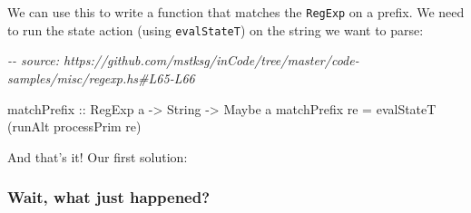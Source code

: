 \documentclass[]{article}
\newenvironment{Shaded}{}{}
\newcommand{\CommentTok}[1]{\textcolor[rgb]{0.38,0.63,0.69}{\textit{#1}}}
\newcommand{\DataTypeTok}[1]{\textcolor[rgb]{0.56,0.13,0.00}{#1}}
\newcommand{\DecValTok}[1]{\textcolor[rgb]{0.25,0.63,0.44}{#1}}
\newcommand{\FunctionTok}[1]{\textcolor[rgb]{0.02,0.16,0.49}{#1}}
\newcommand{\NormalTok}[1]{#1}
\newcommand{\OperatorTok}[1]{\textcolor[rgb]{0.40,0.40,0.40}{#1}}
\newcommand{\OtherTok}[1]{\textcolor[rgb]{0.00,0.44,0.13}{#1}}
\newcommand{\StringTok}[1]{\textcolor[rgb]{0.25,0.44,0.63}{#1}}
\begin{document}
We can use this to write a function that matches the \texttt{RegExp} on a
prefix. We need to run the state action (using \texttt{evalStateT}) on the
string we want to parse:

\begin{Shaded}
\begin{Highlighting}[]
\CommentTok{{-}{-} source: https://github.com/mstksg/inCode/tree/master/code{-}samples/misc/regexp.hs\#L65{-}L66}

\OtherTok{matchPrefix ::} \DataTypeTok{RegExp}\NormalTok{ a }\OtherTok{{-}\textgreater{}} \DataTypeTok{String} \OtherTok{{-}\textgreater{}} \DataTypeTok{Maybe}\NormalTok{ a}
\NormalTok{matchPrefix re }\OtherTok{=}\NormalTok{ evalStateT (runAlt processPrim re)}
\end{Highlighting}
\end{Shaded}

And that's it! Our first solution:

\begin{Shaded}
\end{Shaded}

\subsubsection{Wait, what just happened?}\label{wait-what-just-happened}
\end{document}
